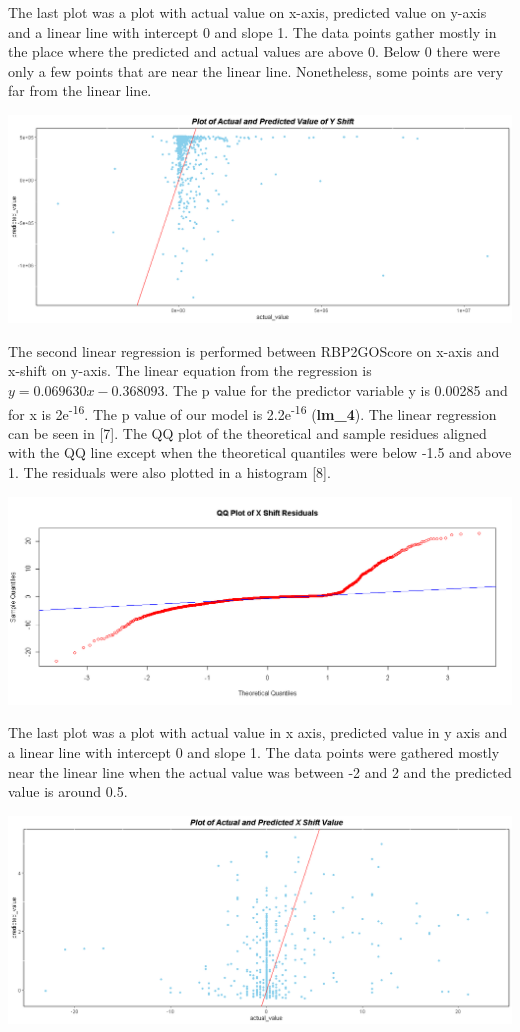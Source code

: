 \documentclass[
]{article}
\begin{document}
The last plot was a plot with actual value on x-axis, predicted value on
y-axis and a linear line with intercept 0 and slope 1. The data points
gather mostly in the place where the predicted and actual values are
above 0. Below 0 there were only a few points that are near the linear
line. Nonetheless, some points are very far from the linear line.

\includegraphics{../results/png/Actual_Predict_Y.png}

The second linear regression is performed between RBP2GOScore on x-axis
and x-shift on y-axis. The linear equation from the regression is
\(y = 0.069630x -0.368093\). The p value for the predictor variable y is
0.00285 and for x is 2e\textsuperscript{-16}. The p value of our model
is 2.2e\textsuperscript{-16} (\textbf{lm\_4}). The linear regression can
be seen in {[}7{]}. The QQ plot of the theoretical and sample residues
aligned with the QQ line except when the theoretical quantiles were
below -1.5 and above 1. The residuals were also plotted in a histogram
{[}8{]}.

\includegraphics{../results/png/QQ_X.png}

The last plot was a plot with actual value in x axis, predicted value in
y axis and a linear line with intercept 0 and slope 1. The data points
were gathered mostly near the linear line when the actual value was
between -2 and 2 and the predicted value is around 0.5.

\includegraphics{../results/png/Actual_Predict_X.png}
\end{document}
